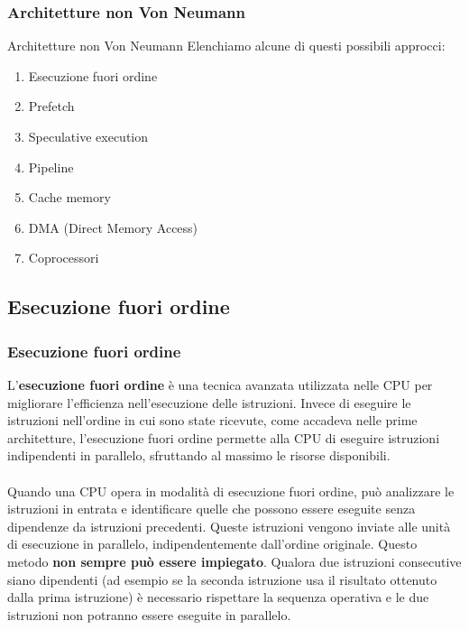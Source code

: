 \begin{frame}
	\frametitle{Architetture non Von Neumann}

	\begin{block}{Architetture non Von Neumann}
		Elenchiamo alcune di questi possibili approcci:
		\begin{enumerate}
			\item Esecuzione fuori ordine
			\item Prefetch
			\item Speculative execution
			\item Pipeline
			\item Cache memory
			\item DMA (Direct Memory Access)
			\item Coprocessori
		\end{enumerate}
	\end{block}

\end{frame}


\subsection[Esecuzione fuori ordine]{Esecuzione fuori ordine}
\begin{frame}
	\frametitle{ Esecuzione fuori ordine}

		L'\textbf{esecuzione fuori ordine} è una tecnica avanzata utilizzata nelle CPU per migliorare l'efficienza nell'esecuzione delle istruzioni. Invece di eseguire le istruzioni nell'ordine in cui sono state ricevute, come accadeva nelle prime architetture, l'esecuzione fuori ordine permette alla CPU di eseguire istruzioni indipendenti in parallelo, sfruttando al massimo le risorse disponibili.\\~\\		
		Quando una CPU opera in modalità di esecuzione fuori ordine, può analizzare le istruzioni in entrata e identificare quelle che possono essere eseguite senza dipendenze da istruzioni precedenti. Queste istruzioni vengono inviate alle unità di esecuzione in parallelo, indipendentemente dall'ordine originale. Questo metodo \textbf{non sempre può essere impiegato}. Qualora due istruzioni consecutive siano dipendenti (ad esempio se la seconda istruzione usa il risultato ottenuto dalla prima istruzione) è necessario rispettare la sequenza operativa e le due istruzioni non potranno essere eseguite in parallelo.

\end{frame}


